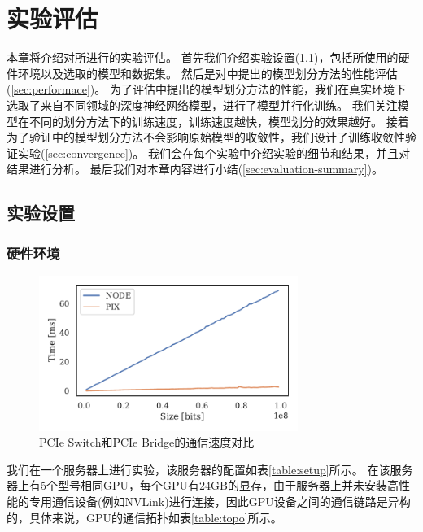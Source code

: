 
\chapter{实验评估}
\label{sec:evaluation}

本章将介绍对\sys{}所进行的实验评估。
首先我们介绍实验设置(\ref{sec:setup})，包括所使用的硬件环境以及选取的模型和数据集。
然后是对\sys{}中提出的模型划分方法的性能评估(\ref{sec:performace})。
为了评估\sys{}中提出的模型划分方法的性能，我们在真实环境下选取了来自不同领域的深度神经网络模型，进行了模型并行化训练。
我们关注模型在不同的划分方法下的训练速度，训练速度越快，模型划分的效果越好。
接着为了验证\sys{}中的模型划分方法不会影响原始模型的收敛性，我们设计了训练收敛性验证实验(\ref{sec:convergence})。
我们会在每个实验中介绍实验的细节和结果，并且对结果进行分析。
最后我们对本章内容进行小结(\ref{sec:evaluation-summary})。


\section{实验设置}
\label{sec:setup}
\subsection{硬件环境}
\label{sec:hardware}


\begin{figure}[h]
	\centering
	\includegraphics[width=0.75\textwidth]{./figure/5-evaluation/pix-vs-node.pdf}
	\caption{PCIe Switch和PCIe Bridge的通信速度对比}
	\label{fig:switch-vs-bridge}
\end{figure}

我们在一个服务器上进行实验，该服务器的配置如表\ref{table:setup}所示。
在该服务器上有5个型号相同GPU，每个GPU有24GB的显存，由于服务器上并未安装高性能的专用通信设备(例如NVLink)进行连接，因此GPU设备之间的通信链路是异构的，具体来说，GPU的通信拓扑如表\ref{table:topo}所示。


